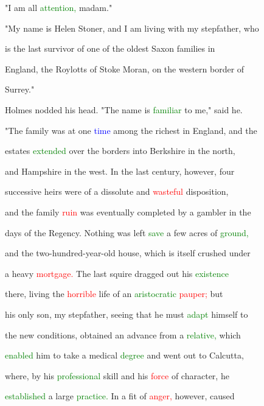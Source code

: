  "I am all \textcolor{green}{attention,} madam."



 "My name is Helen Stoner, and I am living with my stepfather, who

 is the last survivor of one of the oldest Saxon families in

 England, the Roylotts of Stoke Moran, on the western border of

 Surrey."



 Holmes nodded his head. "The name is \textcolor{green}{familiar} to me," said he.



 "The family was at one \textcolor{blue}{time} among the richest in England, and the

 estates \textcolor{green}{extended} over the borders into Berkshire in the north,

 and Hampshire in the west. In the last century, however, four

 successive heirs were of a dissolute and \textcolor{red}{wasteful} disposition,

 and the family \textcolor{red}{ruin} was eventually completed by a \textcolor{BurntOrange}{gambler} in the

 days of the Regency. Nothing was left \textcolor{green}{save} a few acres of \textcolor{green}{ground,}

 and the two-hundred-year-old house, which is itself crushed under

 a heavy \textcolor{red}{mortgage.} The last squire dragged out his \textcolor{green}{existence}

 there, living the \textcolor{red}{horrible} life of an \textcolor{green}{aristocratic} \textcolor{red}{pauper;} but

 his only son, my stepfather, seeing that he must \textcolor{green}{adapt} himself to

 the new conditions, obtained an \textcolor{BurntOrange}{advance} from a \textcolor{green}{relative,} which

 \textcolor{green}{enabled} him to take a \textcolor{BurntOrange}{medical} \textcolor{green}{degree} and went out to Calcutta,

 where, by his \textcolor{green}{professional} skill and his \textcolor{red}{force} of character, he

 \textcolor{green}{established} a large \textcolor{green}{practice.} In a fit of \textcolor{red}{anger,} however, caused

